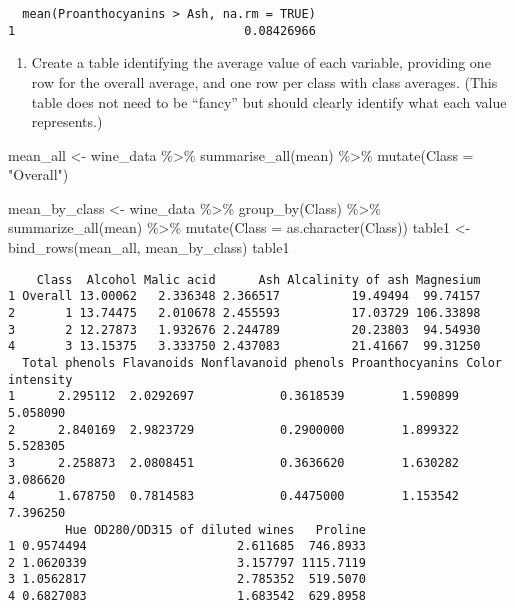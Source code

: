 \documentclass[
  letterpaper,
  DIV=11,
  numbers=noendperiod]{scrartcl}
\newenvironment{Shaded}{\begin{snugshade}}{\end{snugshade}}
\newcommand{\AttributeTok}[1]{\textcolor[rgb]{0.40,0.45,0.13}{#1}}
\newcommand{\FunctionTok}[1]{\textcolor[rgb]{0.28,0.35,0.67}{#1}}
\newcommand{\NormalTok}[1]{\textcolor[rgb]{0.00,0.23,0.31}{#1}}
\newcommand{\OtherTok}[1]{\textcolor[rgb]{0.00,0.23,0.31}{#1}}
\newcommand{\SpecialCharTok}[1]{\textcolor[rgb]{0.37,0.37,0.37}{#1}}
\newcommand{\StringTok}[1]{\textcolor[rgb]{0.13,0.47,0.30}{#1}}
\providecommand{\tightlist}{%
  \setlength{\itemsep}{0pt}\setlength{\parskip}{0pt}}\usepackage{longtable,booktabs,array}
\begin{document}
\begin{verbatim}
  mean(Proanthocyanins > Ash, na.rm = TRUE)
1                                0.08426966
\end{verbatim}

\begin{enumerate}
\def\labelenumi{\alph{enumi}.}
\setcounter{enumi}{3}
\tightlist
\item
  Create a table identifying the average value of each variable,
  providing one row for the overall average, and one row per class with
  class averages. (This table does not need to be ``fancy'' but should
  clearly identify what each value represents.)
\end{enumerate}

\begin{Shaded}
\begin{Highlighting}[]
\NormalTok{mean\_all }\OtherTok{\textless{}{-}}\NormalTok{ wine\_data }\SpecialCharTok{\%\textgreater{}\%} 
            \FunctionTok{summarise\_all}\NormalTok{(mean) }\SpecialCharTok{\%\textgreater{}\%} 
            \FunctionTok{mutate}\NormalTok{(}\AttributeTok{Class =} \StringTok{"Overall"}\NormalTok{)}

\NormalTok{mean\_by\_class }\OtherTok{\textless{}{-}}\NormalTok{ wine\_data }\SpecialCharTok{\%\textgreater{}\%} 
                 \FunctionTok{group\_by}\NormalTok{(Class) }\SpecialCharTok{\%\textgreater{}\%} 
                 \FunctionTok{summarize\_all}\NormalTok{(mean) }\SpecialCharTok{\%\textgreater{}\%} 
                 \FunctionTok{mutate}\NormalTok{(}\AttributeTok{Class =} \FunctionTok{as.character}\NormalTok{(Class))}
\NormalTok{table1 }\OtherTok{\textless{}{-}}  \FunctionTok{bind\_rows}\NormalTok{(mean\_all, mean\_by\_class)}
\NormalTok{table1}
\end{Highlighting}
\end{Shaded}

\begin{verbatim}
    Class  Alcohol Malic acid      Ash Alcalinity of ash Magnesium
1 Overall 13.00062   2.336348 2.366517          19.49494  99.74157
2       1 13.74475   2.010678 2.455593          17.03729 106.33898
3       2 12.27873   1.932676 2.244789          20.23803  94.54930
4       3 13.15375   3.333750 2.437083          21.41667  99.31250
  Total phenols Flavanoids Nonflavanoid phenols Proanthocyanins Color intensity
1      2.295112  2.0292697            0.3618539        1.590899        5.058090
2      2.840169  2.9823729            0.2900000        1.899322        5.528305
3      2.258873  2.0808451            0.3636620        1.630282        3.086620
4      1.678750  0.7814583            0.4475000        1.153542        7.396250
        Hue OD280/OD315 of diluted wines   Proline
1 0.9574494                     2.611685  746.8933
2 1.0620339                     3.157797 1115.7119
3 1.0562817                     2.785352  519.5070
4 0.6827083                     1.683542  629.8958
\end{verbatim}
\end{document}
